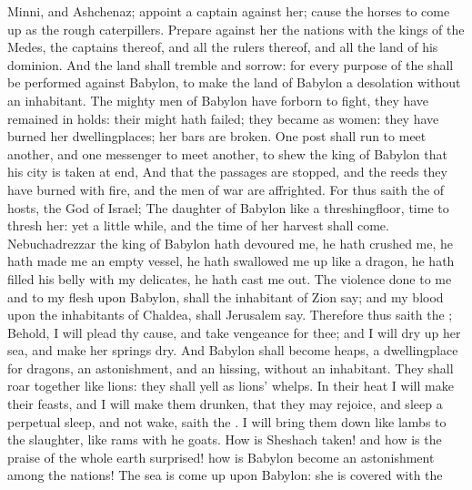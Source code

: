 {Minni, and
Ashchenaz;
appoint a
captain against her; cause the
horses to come
up as the
rough
caterpillers.
Prepare against her the
nations with the
kings of the
Medes, the
captains thereof, and all the
rulers thereof, and all the
land of his
dominion.
And the
land shall
tremble and
sorrow: for every
purpose of the
{} shall be
performed against
Babylon, to
make the
land of
Babylon a
desolation without an
inhabitant.
The mighty
men of
Babylon have
forborn to
fight, they have
remained in
{}
holds: their
might hath
failed; they became as
women: they have
burned her
dwellingplaces; her
bars are
broken.
One
post shall
run to
meet
another, and one
messenger to
meet
another, to
shew the
king of
Babylon that his
city is
taken at
{}
end,
And that the
passages are
stopped, and the
reeds they have
burned with
fire, and the
men of
war are
affrighted.
For thus
saith the
{} of
hosts, the
God of
Israel; The
daughter of
Babylon
{} like a
threshingfloor,
{}
time to
thresh her: yet a little
while, and the
time of her
harvest shall
come.
Nebuchadrezzar the
king of
Babylon hath
devoured me, he hath
crushed me, he hath
made me an
empty
vessel, he hath swallowed me
up like a
dragon, he hath
filled his
belly with my
delicates, he hath cast me
out.
The
violence done to me and to my
flesh
{} upon
Babylon, shall the
inhabitant of
Zion
say; and my
blood upon the
inhabitants of
Chaldea, shall
Jerusalem
say.
Therefore thus
saith the
{}; Behold, I will
plead thy
cause, and take
vengeance for
thee; and I will dry
up her
sea, and make her
springs
dry.
And
Babylon shall become
heaps, a
dwellingplace for
dragons, an
astonishment, and an
hissing, without an
inhabitant.
They shall
roar
together like
lions: they shall
yell as
lions’
whelps.
In their
heat I will
make their
feasts, and I will make them
drunken, that they may
rejoice, and
sleep a
perpetual
sleep, and not
wake,
saith the
{}.
I will bring them
down like
lambs to the
slaughter, like
rams with he
goats.
How is
Sheshach
taken! and how is the
praise of the whole
earth
surprised! how is
Babylon become an
astonishment among the
nations!
The
sea is come
up upon
Babylon: she is
covered with the
}
